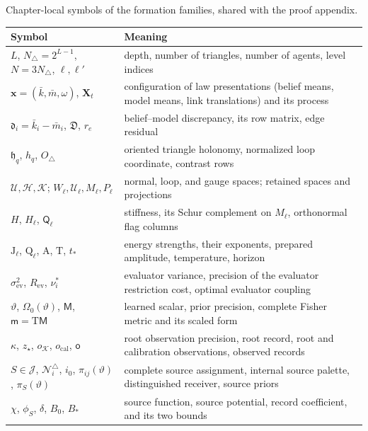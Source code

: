 \begin{sciencetable}{Chapter-local symbols of the formation families, shared with the proof appendix.}
\label{tab:rg-formation-notation}
\begin{tabularx}{\textwidth}{>{\raggedright\arraybackslash}p{}>{\raggedright\arraybackslash}X}
\toprule
\textbf{Symbol} & \textbf{Meaning} \\
\midrule
\(L\), \(N_\triangle=2^{L-1}\), \(N=3N_\triangle\), \(\ell,\ell'\) & depth, number of triangles, number of agents, level indices \\
\(\mathbf x=(\bar k,\bar m,\omega)\), \(\mathbf X_t\) & configuration of law presentations (belief means, model means, link translations) and its process \\
\(\mathfrak d_i=\bar k_i-\bar m_i\), \(\mathfrak D\), \(r_e\) & belief--model discrepancy, its row matrix, edge residual \\
\(\mathfrak h_q\), \(h_q\), \(O_\triangle\) & oriented triangle holonomy, normalized loop coordinate, contrast rows \\
\(\mathcal U,\mathcal H,\mathcal K\); \(W_\ell,\mathcal U_\ell,M_\ell,P_\ell\) & normal, loop, and gauge spaces; retained spaces and projections \\
\(H\), \(H_\ell\), \(\mathsf Q_\ell\) & stiffness, its Schur complement on \(M_\ell\), orthonormal flag columns \\
\(\mathrm J_\ell\), \(\mathrm Q_\ell\), \(\mathrm A\), \(\mathrm T\), \(t_*\) & energy strengths, their exponents, prepared amplitude, temperature, horizon \\
\(\sigma^2_{\mathrm{ev}}\), \(R_{\mathrm{ev}}\), \(\nu^*_i\) & evaluator variance, precision of the evaluator restriction cost, optimal evaluator coupling \\
\(\vartheta\), \(\Omega_0(\vartheta)\), \(\mathsf M\), \(\mathsf m=\mathrm T\mathsf M\) & learned scalar, prior precision, complete Fisher metric and its scaled form \\
\(\kappa\), \(z_\star\), \(o_{\mathcal K}\), \(o_{\mathrm{cal}}\), \(\mathsf o\) & root observation precision, root record, root and calibration observations, observed records \\
\(S\in\mathcal J\), \(\mathcal N_i^\triangle\), \(i_0\), \(\pi_{ij}(\vartheta)\), \(\pi_S(\vartheta)\) & complete source assignment, internal source palette, distinguished receiver, source priors \\
\(\chi\), \(\phi_S\), \(\delta\), \(B_0\), \(B_*\) & source function, source potential, record coefficient, and its two bounds \\

\end{tabularx}
\end{sciencetable}
